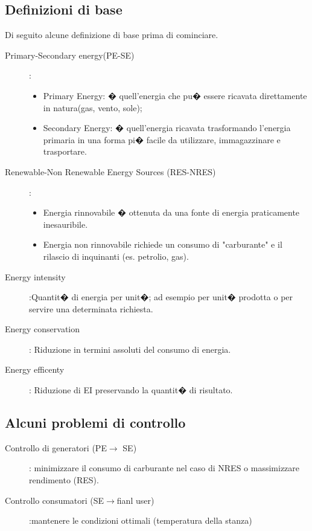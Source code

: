 \subsection{Definizioni di base}
Di seguito alcune definizione di base prima di cominciare.
\begin{description}
\item[Primary-Secondary energy(PE-SE)]:
\begin{itemize}
\item Primary Energy: � quell'energia che pu� essere ricavata direttamente in natura(gas, vento, sole);
\item Secondary Energy: � quell'energia ricavata trasformando l'energia primaria in una forma pi� facile da utilizzare, immagazzinare e trasportare.
\end{itemize}
\item[Renewable-Non Renewable Energy Sources (RES-NRES)]:
\begin{itemize}
\item Energia rinnovabile � ottenuta da una fonte di energia praticamente inesauribile.
\item Energia non rinnovabile richiede un consumo di "carburante" e il rilascio di inquinanti (es. petrolio, gas).
\end{itemize}
\item[Energy intensity]:Quantit� di energia per unit�; ad esempio per unit� prodotta o per servire una determinata richiesta.
\item[Energy conservation]: Riduzione in termini assoluti del consumo di energia.
\item[Energy efficenty]: Riduzione di EI preservando la quantit� di risultato.
\end{description}

\subsection{Alcuni problemi di controllo}
\begin{description}
\item[Controllo di generatori (PE$\rightarrow$ SE)]: minimizzare il consumo di carburante nel caso di NRES o massimizzare rendimento (RES).
\item[Controllo consumatori (SE$\rightarrow$fianl user)]:mantenere le condizioni ottimali (temperatura della stanza)
\end{description}

